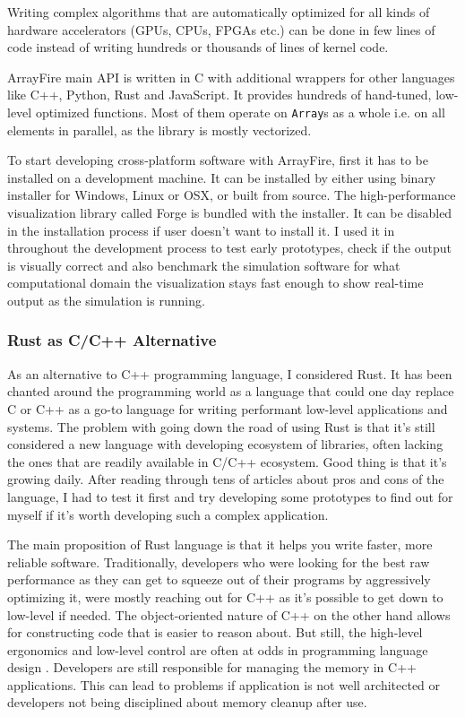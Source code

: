 Writing complex algorithms that are automatically optimized for all kinds of hardware accelerators (GPUs, CPUs, FPGAs etc.) can be done in few lines of code instead of writing hundreds or thousands of lines of kernel code. 

ArrayFire main API is written in C with additional wrappers for other languages like C++, Python, Rust and JavaScript. It provides hundreds of hand-tuned, low-level optimized functions.  Most of them operate on \texttt{Array}s as a whole i.e. on all elements in parallel, as the library is mostly vectorized.

To start developing cross-platform software with ArrayFire, first it has to be installed on a development machine. It can be installed by either using binary installer for Windows, Linux or OSX, or built from source. The high-performance visualization library called Forge is bundled with the installer. It can be disabled in the installation process if user doesn't want to install it. I used it in throughout the development process to test early prototypes, check if the output is visually correct and also benchmark the simulation software for what computational domain the visualization stays fast enough to show real-time output as the simulation is running.

\subsubsection{Rust as C/C++ Alternative} \label{sec:rust-alt}
As an alternative to C++ programming language, I considered Rust. It has been chanted around the programming world as a language that could one day replace C or C++ as a go-to language for writing performant low-level applications and systems. The problem with going down the road of using Rust is that it's still considered a new language with developing ecosystem of libraries, often lacking the ones that are readily available in C/C++ ecosystem. Good thing is that it's growing daily. After reading through tens of articles about pros and cons of the language, I had to test it first and try developing some prototypes to find out for myself if it's worth developing such a complex application.

The main proposition of Rust language is that it helps you write faster, more reliable software. Traditionally, developers who were looking for the best raw performance as they can get to squeeze out of their programs by aggressively optimizing it, were mostly reaching out for C++ as it's possible to get down to low-level if needed. The object-oriented nature of C++ on the other hand allows for constructing code that is easier to reason about. But still, the high-level ergonomics and low-level control are often at odds in programming language design \citep{steveklabnik2018}. Developers are still responsible for managing the memory in C++ applications. This can lead to problems if application is not well architected or developers not being disciplined about memory cleanup after use.

